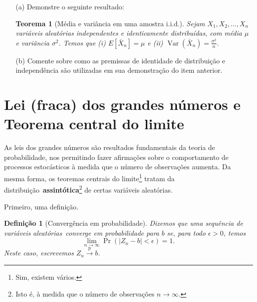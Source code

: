 \documentclass[a4paper,12pt, notitlepage]{paper}
\newtheorem{theo}{Teorema}
\newtheorem{defn}{Definição}
\newcommand{\pr}{\operatorname{Pr}} %
\newcommand{\vr}{\operatorname{Var}} %
\newcommand{\rs}{X_1, X_2, \ldots, X_n} %
\begin{document}
\begin{itemize}
 \item[(a)] Demonstre o seguinte resultado:
 \begin{theo}[Média e variância em uma amostra i.i.d.]
\label{thm:iid_properties}
Sejam  $\rs$ variáveis aleatórias independentes e identicamente distribuídas, com média $\mu$ e variância $\sigma^2$.
Temos que (i) $E[\bar{X}_n] = \mu$ e (ii) $\vr(\bar{X}_n) = \frac{\sigma^2}{n}$.
\end{theo}
 \item[(b)] Comente sobre como as premissas de identidade de distribuição e independência são utilizadas em sua demonstração do item anterior.
\end{itemize} 

\section{Lei (fraca) dos grandes números e Teorema central do limite}

As leis dos grandes números são resultados fundamentais da teoria de probabilidade, nos permitindo fazer afirmações sobre o comportamento de processos estocásticos à medida que o número de observações aumenta.
Da mesma forma, os teoremas centrais do limite\footnote{Sim, existem vários.} tratam da distribuição~\textbf{assintótica}\footnote{Isto é, à medida que o número de observações $n \to \infty$.} de certas variáveis aleatórias.

Primeiro, uma definição.
\begin{defn}[Convergência em probabilidade]
\label{defn:weak_convergence}
Dizemos que uma sequência de variáveis aleatórias~\textit{converge em probabilidade} para $b$ se, para todo $\epsilon > 0$, temos
\begin{equation}
 \nonumber
 \lim_{n\to\infty} \pr\left(|Z_n-b| < \epsilon \right) = 1.
\end{equation}
Neste caso, escrevemos $Z_n \xrightarrow{\text{p}} b$.
\end{defn}
\end{document}
